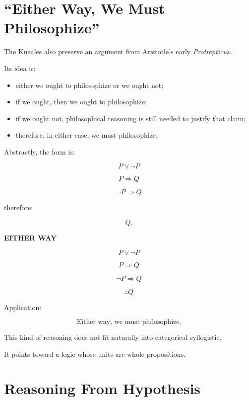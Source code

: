 \documentclass[11pt]{article}
\begin{document}
\section{``Either Way, We Must Philosophize''}

The Kneales also preserve an argument from Aristotle's early
\textit{Protrepticus}.

Its idea is:

\begin{itemize}
    \item either we ought to philosophize or we ought not;
    \item if we ought, then we ought to philosophize;
    \item if we ought not, philosophical reasoning is still needed
    to justify that claim;
    \item therefore, in either case, we must philosophize.
\end{itemize}

Abstractly, the form is:

\[
P\lor\neg P
\]

\[
P\Rightarrow Q
\]

\[
\neg P\Rightarrow Q
\]

therefore:

\[
Q.
\]

\begin{whiteboard}
\textbf{EITHER WAY}

\[
P\lor\neg P
\]

\[
P\Rightarrow Q
\]

\[
\neg P\Rightarrow Q
\]

\[
\therefore Q
\]

Application:

\[
\boxed{\text{Either way, we must philosophize.}}
\]
\end{whiteboard}

This kind of reasoning does not fit naturally into categorical
syllogistic.

It points toward a logic whose units are whole propositions.

\section{Reasoning From Hypothesis}
\end{document}
